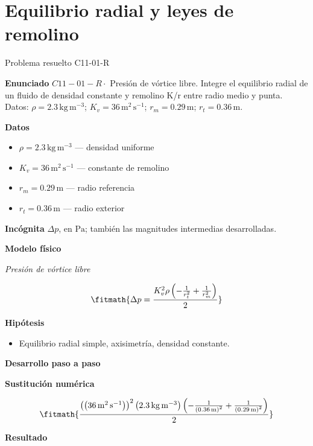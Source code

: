 \documentclass[10pt,openany]{book}
\begin{document}
\chapter{Equilibrio radial y leyes de remolino}
\begin{studiumworked}{Problema resuelto C11-01-R}


\noindent\textbf{Enunciado}
\(C11-01-R \cdot\) Presión de vórtice libre. Integre el equilibrio radial de un fluido de densidad constante y remolino K/r entre radio medio y punta. Datos: \(\rho=2.3\, \mathrm{kg}\,\mathrm{m}^{-3}\); \(K_v=36\, \mathrm{m}^{2}\,\mathrm{s}^{-1}\); \(r_m=0.29\, \mathrm{m}\); \(r_t=0.36\, \mathrm{m}\).

\noindent\textbf{Datos}
\begin{itemize}
\item $\rho = 2.3\,\mathrm{kg}\,\mathrm{m}^{-3}$ — densidad uniforme
\item $K_v = 36\,\mathrm{m}^{2}\,\mathrm{s}^{-1}$ — constante de remolino
\item $r_m = 0.29\,\mathrm{m}$ — radio referencia
\item $r_t = 0.36\,\mathrm{m}$ — radio exterior
\end{itemize}

\noindent\textbf{Incógnita}
$\Delta p$, en $\mathrm{Pa}$; también las magnitudes intermedias desarrolladas.

\noindent\textbf{Modelo físico}

\noindent\textit{Presión de vórtice libre}

\[
\fitmath{\Delta p=\frac{K_v^{2} \rho \left(- \frac{1}{r_t^{2}} + \frac{1}{r_m^{2}}\right)}{2}}
\]

\noindent\textbf{Hipótesis}
\begin{itemize}
\item Equilibrio radial simple, axisimetría, densidad constante.
\end{itemize}

\noindent\textbf{Desarrollo paso a paso}



\noindent\textbf{Sustitución numérica}

\[
\fitmath{\frac{\left(\left(36\,\mathrm{m}^{2}\,\mathrm{s}^{-1}\right)\right)^{2} \left(2.3\,\mathrm{kg}\,\mathrm{m}^{-3}\right) \left(- \frac{1}{\left(0.36\,\mathrm{m}\right)^{2}} + \frac{1}{\left(0.29\,\mathrm{m}\right)^{2}}\right)}{2}}
\]

\noindent\textbf{Resultado}


\end{studiumworked}
\end{document}
